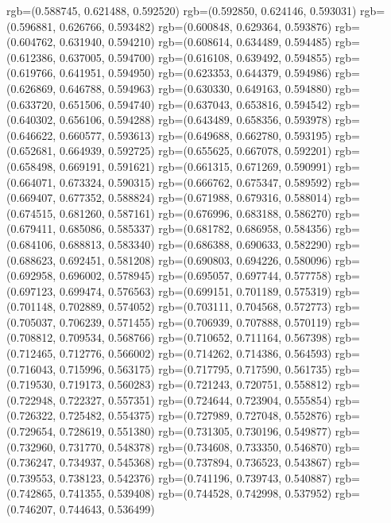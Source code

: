 {{{					rgb=(0.588745, 0.621488, 0.592520)
					rgb=(0.592850, 0.624146, 0.593031)
					rgb=(0.596881, 0.626766, 0.593482)
					rgb=(0.600848, 0.629364, 0.593876)
					rgb=(0.604762, 0.631940, 0.594210)
					rgb=(0.608614, 0.634489, 0.594485)
					rgb=(0.612386, 0.637005, 0.594700)
					rgb=(0.616108, 0.639492, 0.594855)
					rgb=(0.619766, 0.641951, 0.594950)
					rgb=(0.623353, 0.644379, 0.594986)
					rgb=(0.626869, 0.646788, 0.594963)
					rgb=(0.630330, 0.649163, 0.594880)
					rgb=(0.633720, 0.651506, 0.594740)
					rgb=(0.637043, 0.653816, 0.594542)
					rgb=(0.640302, 0.656106, 0.594288)
					rgb=(0.643489, 0.658356, 0.593978)
					rgb=(0.646622, 0.660577, 0.593613)
					rgb=(0.649688, 0.662780, 0.593195)
					rgb=(0.652681, 0.664939, 0.592725)
					rgb=(0.655625, 0.667078, 0.592201)
					rgb=(0.658498, 0.669191, 0.591621)
					rgb=(0.661315, 0.671269, 0.590991)
					rgb=(0.664071, 0.673324, 0.590315)
					rgb=(0.666762, 0.675347, 0.589592)
					rgb=(0.669407, 0.677352, 0.588824)
					rgb=(0.671988, 0.679316, 0.588014)
					rgb=(0.674515, 0.681260, 0.587161)
					rgb=(0.676996, 0.683188, 0.586270)
					rgb=(0.679411, 0.685086, 0.585337)
					rgb=(0.681782, 0.686958, 0.584356)
					rgb=(0.684106, 0.688813, 0.583340)
					rgb=(0.686388, 0.690633, 0.582290)
					rgb=(0.688623, 0.692451, 0.581208)
					rgb=(0.690803, 0.694226, 0.580096)
					rgb=(0.692958, 0.696002, 0.578945)
					rgb=(0.695057, 0.697744, 0.577758)
					rgb=(0.697123, 0.699474, 0.576563)
					rgb=(0.699151, 0.701189, 0.575319)
					rgb=(0.701148, 0.702889, 0.574052)
					rgb=(0.703111, 0.704568, 0.572773)
					rgb=(0.705037, 0.706239, 0.571455)
					rgb=(0.706939, 0.707888, 0.570119)
					rgb=(0.708812, 0.709534, 0.568766)
					rgb=(0.710652, 0.711164, 0.567398)
					rgb=(0.712465, 0.712776, 0.566002)
					rgb=(0.714262, 0.714386, 0.564593)
					rgb=(0.716043, 0.715996, 0.563175)
					rgb=(0.717795, 0.717590, 0.561735)
					rgb=(0.719530, 0.719173, 0.560283)
					rgb=(0.721243, 0.720751, 0.558812)
					rgb=(0.722948, 0.722327, 0.557351)
					rgb=(0.724644, 0.723904, 0.555854)
					rgb=(0.726322, 0.725482, 0.554375)
					rgb=(0.727989, 0.727048, 0.552876)
					rgb=(0.729654, 0.728619, 0.551380)
					rgb=(0.731305, 0.730196, 0.549877)
					rgb=(0.732960, 0.731770, 0.548378)
					rgb=(0.734608, 0.733350, 0.546870)
					rgb=(0.736247, 0.734937, 0.545368)
					rgb=(0.737894, 0.736523, 0.543867)
					rgb=(0.739553, 0.738123, 0.542376)
					rgb=(0.741196, 0.739743, 0.540887)
					rgb=(0.742865, 0.741355, 0.539408)
					rgb=(0.744528, 0.742998, 0.537952)
					rgb=(0.746207, 0.744643, 0.536499)
}}}
